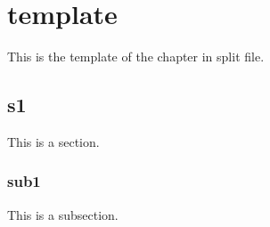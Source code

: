 \chapter{template}
This is the template of the chapter in split file.

\section{s1}
This is a section.

\subsection{sub1}
This is a subsection.


%
%
%
%
%
%
%
%
%
%
%
%
%
